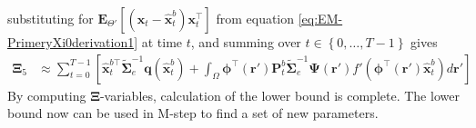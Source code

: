 \documentclass[]{article}
\begin{document}
substituting for $\mathbf E_{\Theta'}\left[(\mathbf x_t - \mathbf  {\hat x}_t^b)\mathbf x_t^\top\right] $ from equation \eqref{eq:EM-PrimeryXi0derivation1} at time $t$, and summing over $t \in \left\lbrace 0, \dots, T-1\right\rbrace $ gives
\begin{align}
\boldsymbol\Xi_{5}&\approx\sum_{t=0}^{T-1}\left[ \mathbf{\hat x}_{t}^{b\top}\tilde{\boldsymbol\Sigma}_e^{-1}\mathbf q(\mathbf{\hat x}_t^b)+\int_\Omega\boldsymbol \phi^\top(\mathbf r') \mathbf P_t^b \tilde{\boldsymbol\Sigma}_e^{-1}  \boldsymbol{\Psi}(\mathbf{r}') f'(\boldsymbol \phi^\top(\mathbf r')\mathbf {\hat x}_t^b) d\mathbf{r}'\right] \label{eq:Xi5Ap}
 \end{align}
By computing $\boldsymbol\Xi$-variables, calculation of the lower bound is complete. The lower bound now can be used in M-step to find a set of new parameters. 
\end{document}
